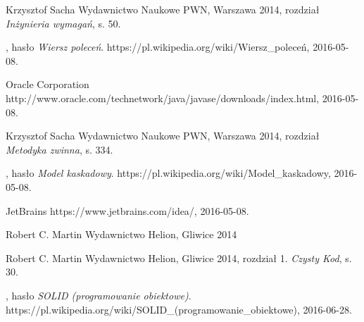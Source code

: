 \documentclass[11pt]{aghdpl}
\begin{document}
\begin{thebibliography}{1}
\bibitem{}
\label{bib:analiza_wymagan}
Krzysztof Sacha
\newblock Wydawnictwo Naukowe PWN, Warszawa 2014,
\newblock rozdział {\em Inżynieria wymagań}, s. 50.

\bibitem{}
\label{bib:wiki_wierszPolecen}
, hasło {\em Wiersz poleceń}.
\newblock https://pl.wikipedia.org/wiki/Wiersz\_poleceń, 2016-05-08.

\bibitem{}
\label{bib:java}
Oracle Corporation
\newblock http://www.oracle.com/technetwork/java/javase/downloads/index.html, 2016-05-08.

\bibitem{}
\label{bib:analiza_wymagan}
Krzysztof Sacha
\newblock Wydawnictwo Naukowe PWN, Warszawa 2014,
\newblock rozdział {\em Metodyka zwinna}, s. 334.

\bibitem{}
\label{bib:wiki_waterfall}
, hasło {\em Model kaskadowy}.
\newblock https://pl.wikipedia.org/wiki/Model\_kaskadowy, 2016-05-08.
	
\bibitem{}
\label{bib:intellij}
JetBrains
\newblock https://www.jetbrains.com/idea/, 2016-05-08.

\bibitem{}
\label{bib:czysty_kod}
Robert C. Martin
\newblock Wydawnictwo Helion, Gliwice 2014


\bibitem{}
\label{bib:czysty_kod_cytat_booch}
Robert C. Martin
\newblock Wydawnictwo Helion, Gliwice 2014,
\newblock rozdział 1. {\em Czysty Kod}, s. 30.

\bibitem{}
\label{bib:wiki_SOLID}
, hasło {\em SOLID (programowanie obiektowe)}.
\newblock https://pl.wikipedia.org/wiki/SOLID\_(programowanie\_obiektowe), 2016-06-28.

\end{thebibliography}
\end{document}
